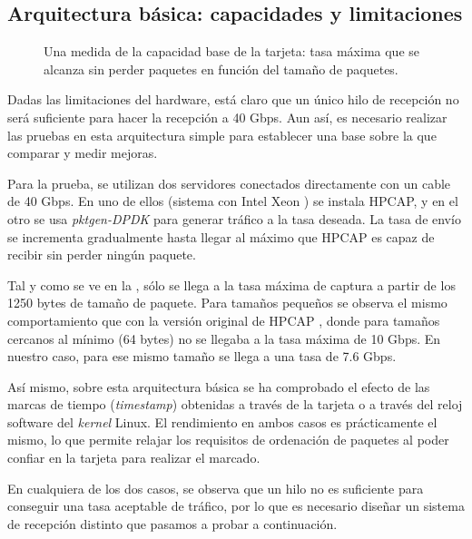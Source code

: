 \documentclass[oneside, draft]{epstfg}
\begin{document}
\subsection{Arquitectura básica: capacidades y limitaciones}

\begin{figure}[btp]
\caption[Capacidad de una arquitectura básica de captura]{Una medida de la capacidad base de la tarjeta: tasa máxima que se alcanza sin perder paquetes en función del tamaño de paquetes.}
\label{fig:Validacion:SimpleArchRate}
\end{figure}

Dadas las limitaciones del hardware, está claro que un único hilo de recepción no será suficiente para hacer la recepción a 40 Gbps. Aun así, es necesario realizar las pruebas en esta arquitectura simple para establecer una base sobre la que comparar y medir mejoras.

Para la prueba, se utilizan dos servidores conectados directamente con un cable de 40 Gbps. En uno de ellos (sistema con Intel Xeon ) se instala HPCAP, y en el otro se usa \textit{pktgen-DPDK} para generar tráfico a la tasa deseada. La tasa de envío se incrementa gradualmente hasta llegar al máximo que HPCAP es capaz de recibir sin perder ningún paquete.

Tal y como se ve en la , sólo se llega a la tasa máxima de captura a partir de los 1250 bytes de tamaño de paquete. Para tamaños pequeños se observa el mismo comportamiento que con la versión original de HPCAP \citep{MorenoTFM2012}, donde para tamaños cercanos al mínimo (64 bytes) no se llegaba a la tasa máxima de 10 Gbps. En nuestro caso, para ese mismo tamaño se llega a una tasa de 7.6 Gbps.

Así mismo, sobre esta arquitectura básica se ha comprobado el efecto de las marcas de tiempo (\textit{timestamp}) obtenidas a través de la tarjeta o a través del reloj software del \textit{kernel} Linux. El rendimiento en ambos casos es prácticamente el mismo, lo que permite relajar los requisitos de ordenación de paquetes al poder confiar en la tarjeta para realizar el marcado.

En cualquiera de los dos casos, se observa que un hilo no es suficiente para conseguir una tasa aceptable de tráfico, por lo que es necesario diseñar un sistema de recepción distinto que pasamos a probar a continuación.
\end{document}

